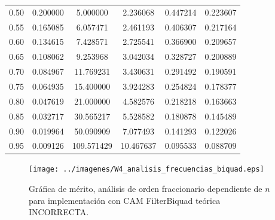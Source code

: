 \documentclass[10pt]{beamer}
\begin{document}
\begin{frame}
\begin{minipage}[b]{0.45\textwidth}
\begin{tiny}
\begin{table}[!hbp]
\begin{tabular}{cccccc}
			0.50 & 0.200000 & 5.000000 & 2.236068 & 0.447214 & 0.223607 \\   
		                                                         
			0.55 & 0.165085 & 6.057471 & 2.461193 & 0.406307 & 0.217164 \\   
			                                                         
			0.60 & 0.134615 & 7.428571 & 2.725541 & 0.366900 & 0.209657 \\   
		                                                         
			0.65 & 0.108062 & 9.253968 & 3.042034 & 0.328727 & 0.200889 \\   
		                                                          
			0.70 & 0.084967 & 11.769231 & 3.430631 & 0.291492 & 0.190591 \\  
		                                                         
			0.75 & 0.064935 & 15.400000 & 3.924283 & 0.254824 & 0.178377 \\  
			                                                          
			0.80 & 0.047619 & 21.000000 & 4.582576 & 0.218218 & 0.163663 \\  
		                                                         
			0.85 & 0.032717 & 30.565217 & 5.528582 & 0.180878 & 0.145489 \\  
			                                                         
			0.90 & 0.019964 & 50.090909 & 7.077493 & 0.141293 & 0.122026 \\  
			                                                           
			0.95 & 0.009126 & 109.571429 & 10.467637 & 0.095533 & 0.088709 \\
			\hline                                              
			\end{tabular}                                                                
	\end{table}
			\end{tiny}
		\end{minipage} \hfill \begin{minipage}[b]{0.45\textwidth}
			\begin{figure}[hbtp]
		\caption{Gráfica de mérito, análisis de orden fraccionario dependiente de $n$ para implementación con CAM FilterBiquad teórica INCORRECTA.} 
		\label{fig:W4_analisis_frecuencias_biquad}
		\centering
		\texttt{[image: ../imagenes/W4\_analisis\_frecuencias\_biquad.eps]}
	\end{figure}
		\end{minipage}
	\end{frame}
\end{document}
